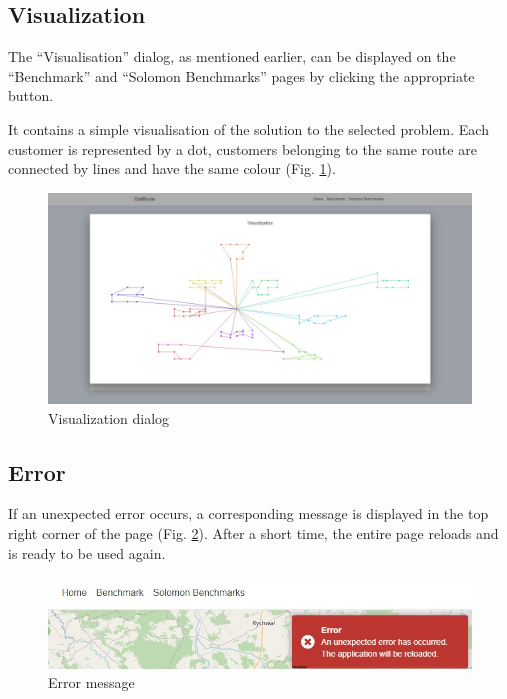 \documentclass[a4paper,twoside,12pt]{book}
\begin{document}
\subsection{Visualization}

The ``Visualisation'' dialog, as mentioned earlier, can be displayed on the ``Benchmark'' and ``Solomon Benchmarks'' pages by clicking the appropriate button. 

It contains a simple visualisation of the solution to the selected problem. Each customer is represented by a dot, customers belonging to the same route are connected by lines and have the same colour (Fig. \ref{fig:visualization}).

\begin{figure}[htb]
\centering
\includegraphics[width=\textwidth]{images/visualization.jpg}
\caption{Visualization dialog}
\label{fig:visualization}
\end{figure}

\subsection{Error}

If an unexpected error occurs, a corresponding message is displayed in the top right corner of the page (Fig. \ref{fig:error}). After a short time, the entire page reloads and is ready to be used again.

\begin{figure}[htb]
\centering
\includegraphics[scale=0.7]{images/error.jpg}
\caption{Error message}
\label{fig:error}
\end{figure}
\end{document}
